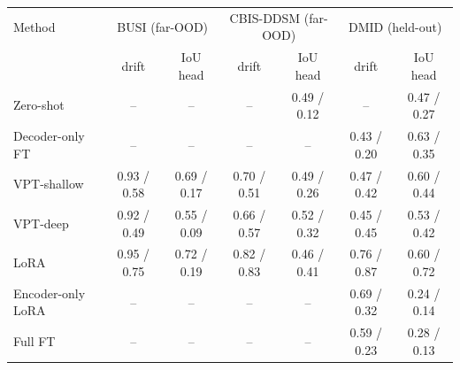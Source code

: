 \begin{tabular}{lcccccc}
\toprule
Method & \multicolumn{2}{c}{BUSI (far-OOD)} & \multicolumn{2}{c}{CBIS-DDSM (far-OOD)} & \multicolumn{2}{c}{DMID (held-out)} \\
 & drift & IoU head & drift & IoU head & drift & IoU head \\
\midrule
Zero-shot & -- & -- & -- & 0.49 / 0.12 & -- & 0.47 / 0.27 \\
Decoder-only FT & -- & -- & -- & -- & 0.43 / 0.20 & 0.63 / 0.35 \\
VPT-shallow & 0.93 / 0.58 & 0.69 / 0.17 & 0.70 / 0.51 & 0.49 / 0.26 & 0.47 / 0.42 & 0.60 / 0.44 \\
VPT-deep & 0.92 / 0.49 & 0.55 / 0.09 & 0.66 / 0.57 & 0.52 / 0.32 & 0.45 / 0.45 & 0.53 / 0.42 \\
LoRA & 0.95 / 0.75 & 0.72 / 0.19 & 0.82 / 0.83 & 0.46 / 0.41 & 0.76 / 0.87 & 0.60 / 0.72 \\
Encoder-only LoRA & -- & -- & -- & -- & 0.69 / 0.32 & 0.24 / 0.14 \\
Full FT & -- & -- & -- & -- & 0.59 / 0.23 & 0.28 / 0.13 \\
\bottomrule
\end{tabular}
